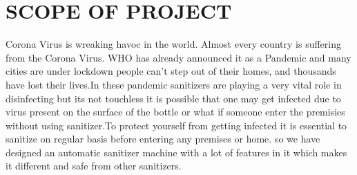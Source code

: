 \chapter{SCOPE OF PROJECT}

\vspace{1.00cm}

     Corona Virus is wreaking havoc in the world. Almost every country is suffering from the Corona Virus. WHO has already announced it as a Pandemic and many cities are under lockdown people can’t step out of their homes, and thousands have lost their lives.In these pandemic sanitizers are playing a very vital role in disinfecting but its not touchless it is possible that one may get infected due to virus present on the surface of the bottle or what if someone enter the premisies without using sanitizer.To protect yourself from getting infected it is essential to sanitize on regular basis before entering any premises or home. so we have designed an automatic sanitizer machine with a lot of features in it which makes it different and safe from other sanitizers.


 
      
  
   